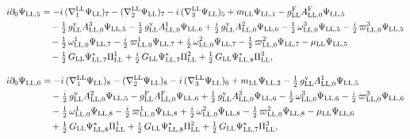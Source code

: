 \documentclass[
  10pt,
]{article}
\begin{document}
\[\begin{aligned}
i\partial_0\Psi_{{\rm LL},5}&=-i\,(\nabla^{\rm LL}_1\Psi_{\rm LL})_7-(\nabla^{\rm LL}_2\Psi_{\rm LL})_7-i\,(\nabla^{\rm LL}_3\Psi_{\rm LL})_5+m_{\rm LL}\Psi_{{\rm LL},1}-g^{\rm F}_{\rm LL}A^{\rm F}_{{\rm LL},0}\Psi_{{\rm LL},5}\\
&\quad -\tfrac{1}{2}\,g^{\rm v}_{\rm LL}A^{3}_{{\rm LL},0}\Psi_{{\rm LL},5}-\tfrac{1}{2}\,g^{\rm v}_{\rm LL}A^{1}_{{\rm LL},0}\Psi_{{\rm LL},6}+\tfrac{i}{2}\,g^{\rm v}_{\rm LL}A^{2}_{{\rm LL},0}\Psi_{{\rm LL},6}-\tfrac{1}{2}\,\omega^{3}_{{\rm LL},0}\Psi_{{\rm LL},5}-\tfrac{i}{2}\,\varpi^{3}_{{\rm LL},0}\Psi_{{\rm LL},5}\\
&\quad -\tfrac{1}{2}\,\omega^{1}_{{\rm LL},0}\Psi_{{\rm LL},7}-\tfrac{i}{2}\,\varpi^{1}_{{\rm LL},0}\Psi_{{\rm LL},7}+\tfrac{i}{2}\,\omega^{2}_{{\rm LL},0}\Psi_{{\rm LL},7}-\tfrac{1}{2}\,\varpi^{2}_{{\rm LL},0}\Psi_{{\rm LL},7}-\mu_{\rm LL}\Psi_{{\rm LL},5}\\
&\quad -\tfrac{1}{2}\,G_{\rm LL}\Psi^*_{{\rm LL},7}\Pi^1_{\rm LL}+\tfrac{i}{2}\,G_{\rm LL}\Psi^*_{{\rm LL},7}\Pi^2_{\rm LL}+\tfrac{1}{2}\,G_{\rm LL}\Psi^*_{{\rm LL},8}\Pi^3_{\rm LL},
\end{aligned}\]

\[\begin{aligned}
i\partial_0\Psi_{{\rm LL},6}&=-i\,(\nabla^{\rm LL}_1\Psi_{\rm LL})_8-(\nabla^{\rm LL}_2\Psi_{\rm LL})_8-i\,(\nabla^{\rm LL}_3\Psi_{\rm LL})_6+m_{\rm LL}\Psi_{{\rm LL},2}-\tfrac{1}{2}\,g^{\rm v}_{\rm LL}A^{1}_{{\rm LL},0}\Psi_{{\rm LL},5}\\
&\quad -\tfrac{i}{2}\,g^{\rm v}_{\rm LL}A^{2}_{{\rm LL},0}\Psi_{{\rm LL},5}-g^{\rm F}_{\rm LL}A^{\rm F}_{{\rm LL},0}\Psi_{{\rm LL},6}+\tfrac{1}{2}\,g^{\rm v}_{\rm LL}A^{3}_{{\rm LL},0}\Psi_{{\rm LL},6}-\tfrac{1}{2}\,\omega^{3}_{{\rm LL},0}\Psi_{{\rm LL},6}-\tfrac{i}{2}\,\varpi^{3}_{{\rm LL},0}\Psi_{{\rm LL},6}\\
&\quad -\tfrac{1}{2}\,\omega^{1}_{{\rm LL},0}\Psi_{{\rm LL},8}-\tfrac{i}{2}\,\varpi^{1}_{{\rm LL},0}\Psi_{{\rm LL},8}+\tfrac{i}{2}\,\omega^{2}_{{\rm LL},0}\Psi_{{\rm LL},8}-\tfrac{1}{2}\,\varpi^{2}_{{\rm LL},0}\Psi_{{\rm LL},8}-\mu_{\rm LL}\Psi_{{\rm LL},6}\\
&\quad +\tfrac{1}{2}\,G_{\rm LL}\Psi^*_{{\rm LL},8}\Pi^1_{\rm LL}+\tfrac{i}{2}\,G_{\rm LL}\Psi^*_{{\rm LL},8}\Pi^2_{\rm LL}+\tfrac{1}{2}\,G_{\rm LL}\Psi^*_{{\rm LL},7}\Pi^3_{\rm LL},
\end{aligned}\]
\end{document}
